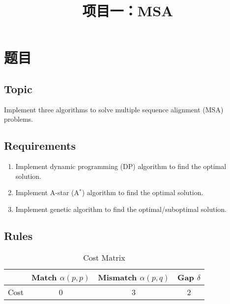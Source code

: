 
    \title{项目一：MSA}
    \maketitle

    \tableofcontents
    \clearpage

    \section{题目}

    \subsection{Topic}

    Implement three algorithms to solve multiple sequence alignment (MSA) problems.

    \subsection{Requirements}

    \begin{enumerate}
        \item Implement dynamic programming (DP) algorithm to find the optimal solution.
        \item Implement A-star (A$^\ast$) algorithm to find the optimal solution.
        \item Implement genetic algorithm to find the optimal/suboptimal solution.
    \end{enumerate}

    \subsection{Rules}

    \begin{table}[H]
        \centering
        \caption{Cost Matrix}\label{tab:costmat}
        \begin{tabular}{cccc}
            \toprule
                & Match $\alpha(p,p)$ & Mismatch $\alpha(p,q)$ & Gap $\delta$ \\
            \midrule
            Cost & 0 & 3 & 2 \\
            \bottomrule
        \end{tabular}
    \end{table}

